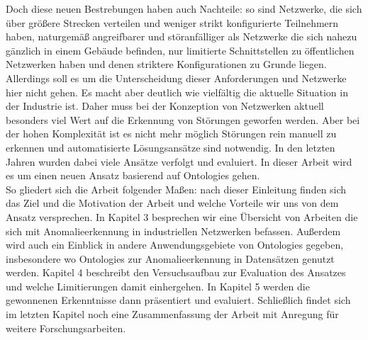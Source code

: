 Doch diese neuen Bestrebungen haben auch Nachteile: so sind Netzwerke, die sich über größere Strecken verteilen und weniger strikt konfigurierte Teilnehmern haben, naturgemäß angreifbarer und störanfälliger als Netzwerke die sich nahezu gänzlich in einem Gebäude befinden, nur limitierte Schnittstellen zu öffentlichen Netzwerken haben und denen striktere Konfigurationen zu Grunde liegen. Allerdings soll es um die Unterscheidung dieser Anforderungen und Netzwerke hier nicht gehen. Es macht aber deutlich wie vielfältig die aktuelle Situation in der Industrie ist. Daher muss bei der Konzeption von Netzwerken aktuell besonders viel Wert auf die Erkennung von Störungen geworfen werden. Aber bei der hohen Komplexität ist es nicht mehr möglich Störungen rein manuell zu erkennen und automatisierte Lösungsansätze sind notwendig. In den letzten Jahren wurden dabei viele Ansätze verfolgt und evaluiert. In dieser Arbeit wird es um einen neuen Ansatz basierend auf \Glspl{Ontologie} gehen.\\
So gliedert sich die Arbeit folgender Maßen: nach dieser Einleitung finden sich das Ziel und die Motivation der Arbeit und welche Vorteile wir uns von dem Ansatz versprechen. In Kapitel 3 besprechen wir eine Übersicht von Arbeiten die sich mit Anomalieerkennung in industriellen Netzwerken befassen. Außerdem wird auch ein Einblick in andere Anwendungsgebiete von \Glspl{Ontologie} gegeben, insbesondere wo \Glspl{Ontologie} zur Anomalieerkennung in Datensätzen genutzt werden. Kapitel 4 beschreibt den Versuchsaufbau zur Evaluation des Ansatzes und welche Limitierungen damit einhergehen. In Kapitel 5 werden die gewonnenen Erkenntnisse dann präsentiert und evaluiert. Schließlich findet sich im letzten Kapitel noch eine Zusammenfassung der Arbeit mit Anregung für weitere Forschungsarbeiten.